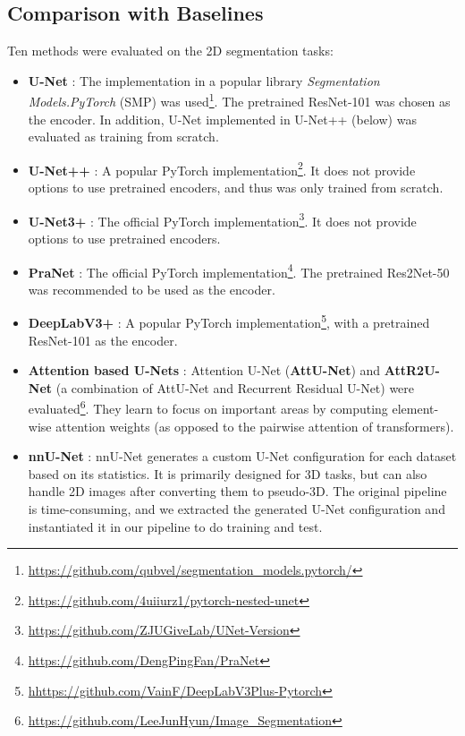 \documentclass{article}
\begin{document}
\subsection{Comparison with Baselines}
Ten methods were evaluated on the 2D segmentation tasks:
\begin{itemize}
    \item \textbf{U-Net} \cite{unet}: The implementation in a popular library \emph{Segmentation Models.PyTorch} (SMP) was used\footnote{\url{https://github.com/qubvel/segmentation_models.pytorch/}}. The pretrained ResNet-101 was chosen as the encoder. In addition, U-Net implemented in U-Net++ (below) was evaluated as training from scratch. 
    
    \item \textbf{U-Net++} \cite{unet++}: A popular PyTorch implementation\footnote{\url{https://github.com/4uiiurz1/pytorch-nested-unet}}. It does not provide options to use pretrained encoders, and thus was only trained from scratch.
    
    \item \textbf{U-Net3+} \cite{unet3+}: The official PyTorch implementation\footnote{\url{https://github.com/ZJUGiveLab/UNet-Version}}. It does not provide options to use pretrained encoders.
    
    \item \textbf{PraNet} \cite{pranet}: The official PyTorch implementation\footnote{\url{https://github.com/DengPingFan/PraNet}}. The pretrained Res2Net-50 \cite{res2net} was recommended to be used as the encoder.
    
    \item \textbf{DeepLabV3+} \cite{deeplabv3+}: A popular PyTorch implementation\footnote{\url{hhttps://github.com/VainF/DeepLabV3Plus-Pytorch}}, with a pretrained ResNet-101 as the encoder.
    
    \item \textbf{Attention based U-Nets} \cite{att-unet}: Attention U-Net (\textbf{AttU-Net}) and \textbf{AttR2U-Net} (a combination of AttU-Net and Recurrent Residual U-Net) were evaluated\footnote{\url{https://github.com/LeeJunHyun/Image_Segmentation}}. They learn to focus on important areas by computing element-wise attention weights (as opposed to the pairwise attention of transformers).
    
    \item \textbf{nnU-Net} \cite{nnunet}: nnU-Net generates a custom U-Net configuration for each dataset based on its statistics. It is primarily designed for 3D tasks, but can also handle 2D images after converting them to pseudo-3D. The original pipeline is time-consuming, and we extracted the generated U-Net configuration and instantiated it in our pipeline to do training and test.
    

\end{itemize}
\end{document}
